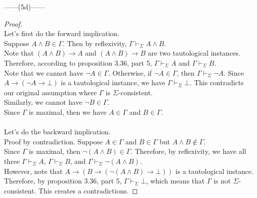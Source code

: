 \documentclass[12pt]{article}
\newcommand{\dr}{\vdash_{\Sigma}}
\begin{document}
\noindent
\begin{center}
    ------(5d)------
\end{center} 
\begin{proof}$ $\\
    Let's first do the forward implication. \\
    Suppose $A \land B \in \Gamma$.
    Then by reflexivity, $\Gamma \dr A \land B$.\\
    Note that $(A \land B) \to A$ and $(A \land B) \to B$ are two tautological instances.\\
    Therefore, according to proposition 3.36, part 5, $\Gamma \dr A$ and $\Gamma \dr B$.\\
    Note that we cannot have $\neg A \in \Gamma$.
    Otherwise, if $\neg A \in \Gamma$, then $\Gamma \dr \neg A$. 
    Since $A \to (\neg A \to \bot)$ is a tautological instance, we have $\Gamma \dr \bot$.
    This contradicts our original assumption where $\Gamma$ is $\Sigma$-consistent.\\
    Similarly, we cannot have $\neg B \in \Gamma$.\\
    Since $\Gamma$ is maximal, then we have $A \in \Gamma$ and $B \in \Gamma$.\\
    \\
    Let's do the backward implication.\\
    Proof by contradiction. Suppose $A \in \Gamma$ and $B \in \Gamma$ but $A \land B \notin \Gamma$.\\
    Since $\Gamma$ is maximal, then $\neg(A \land B) \in \Gamma$.
    Therefore, by reflexivity, we have all three $\Gamma \dr A$, $\Gamma \dr B$, and $\Gamma \dr \neg (A \land B)$.\\
    However, note that $A \to (B \to (\neg(A \land B) \to \bot))$ is a tautological instance.
    Therefore, by proposition 3.36, part 5, $\Gamma \dr \bot$, which means that $\Gamma$ is not $\Sigma$-consistent.
    This creates a contradictions.
    
\end{proof}
\end{document}
